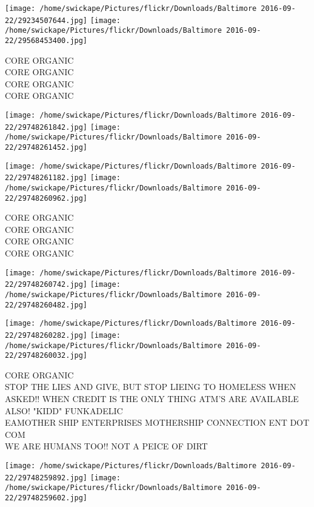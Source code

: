 \documentclass[10pt,letterpaper]{article}
\begin{document}
\texttt{[image: /home/swickape/Pictures/flickr/Downloads/Baltimore 2016-09-22/29234507644.jpg]}
\texttt{[image: /home/swickape/Pictures/flickr/Downloads/Baltimore 2016-09-22/29568453400.jpg]}

CORE ORGANIC\\
CORE ORGANIC\\
CORE ORGANIC\\
CORE ORGANIC\\
\pagebreak

\texttt{[image: /home/swickape/Pictures/flickr/Downloads/Baltimore 2016-09-22/29748261842.jpg]}
\texttt{[image: /home/swickape/Pictures/flickr/Downloads/Baltimore 2016-09-22/29748261452.jpg]}

\texttt{[image: /home/swickape/Pictures/flickr/Downloads/Baltimore 2016-09-22/29748261182.jpg]}
\texttt{[image: /home/swickape/Pictures/flickr/Downloads/Baltimore 2016-09-22/29748260962.jpg]}

CORE ORGANIC\\
CORE ORGANIC\\
CORE ORGANIC\\
CORE ORGANIC\\
\pagebreak

\texttt{[image: /home/swickape/Pictures/flickr/Downloads/Baltimore 2016-09-22/29748260742.jpg]}
\texttt{[image: /home/swickape/Pictures/flickr/Downloads/Baltimore 2016-09-22/29748260482.jpg]}

\texttt{[image: /home/swickape/Pictures/flickr/Downloads/Baltimore 2016-09-22/29748260282.jpg]}
\texttt{[image: /home/swickape/Pictures/flickr/Downloads/Baltimore 2016-09-22/29748260032.jpg]}

CORE ORGANIC\\
STOP THE LIES AND GIVE, BUT STOP LIEING TO HOMELESS WHEN ASKED!! WHEN CREDIT IS THE ONLY THING ATM'S ARE AVAILABLE ALSO! "KIDD" FUNKADELIC\\
EAMOTHER SHIP ENTERPRISES MOTHERSHIP CONNECTION ENT DOT COM\\
WE ARE HUMANS TOO!! NOT A PEICE OF DIRT\\
\pagebreak

\texttt{[image: /home/swickape/Pictures/flickr/Downloads/Baltimore 2016-09-22/29748259892.jpg]}
\texttt{[image: /home/swickape/Pictures/flickr/Downloads/Baltimore 2016-09-22/29748259602.jpg]}
\end{document}
